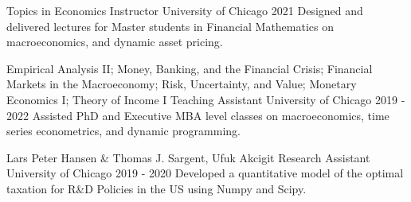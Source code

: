 

\begin{cventries}
	\cventry
	{Topics in Economics}
	{Instructor}
	{University of Chicago}
	{2021}
	{
			 Designed and delivered lectures for Master students in Financial Mathematics on macroeconomics, and dynamic asset pricing.
		}


	\cventry
	{Empirical Analysis II; Money, Banking, and the Financial Crisis; Financial Markets in the Macroeconomy; Risk, Uncertainty, and Value; Monetary Economics I; Theory of Income I}
	{Teaching Assistant}
	{University of Chicago}
	{2019 - 2022}
	{
			 Assisted PhD and Executive MBA level classes on macroeconomics, time series econometrics, and dynamic programming.
		}

	\cventry
	{Lars Peter Hansen \& Thomas J. Sargent, Ufuk Akcigit}
	{Research Assistant}
	{University of Chicago}
	{2019 - 2020}
	{
			 Developed a quantitative model of the optimal taxation for R\&D Policies in the US using Numpy and Scipy.
		}
\end{cventries}
